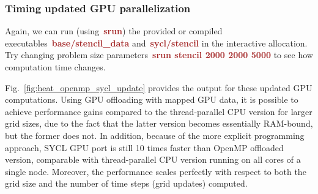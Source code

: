 











\subsubsection{Timing updated GPU parallelization}


\par
Again, we can run (using~\textbf{\textcolor{brown}{srun}}) the provided or compiled executables~\textbf{\textcolor{brown}{base/stencil\_data}} and~\textbf{\textcolor{brown}{sycl/stencil}} in the interactive allocation.
Try changing problem size parameters~\textbf{\textcolor{brown}{srun stencil 2000 2000 5000}} to see how computation time changes.


\par
Fig.~\ref{fig:heat_openmp_sycl_update} provides the output for these updated GPU computations.
Using GPU offloading with mapped GPU data, it is possible to achieve performance gains compared to the thread-parallel CPU version for larger grid sizes, due to the fact that the latter version becomes essentially RAM-bound, but the former does not.
In addition, because of the more explicit programming approach, SYCL GPU port is still 10 times faster than OpenMP offloaded version, comparable with thread-parallel CPU version running on all cores of a single node. Moreover, the performance scales perfectly with respect to both the grid size and the number of time steps (grid updates) computed.


